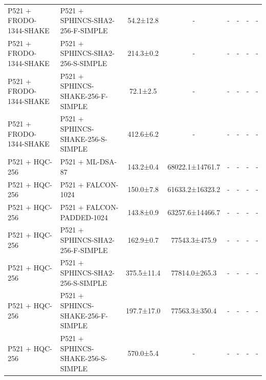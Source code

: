 \documentclass[10pt]{article}
\begin{document}
\begin{tabular}{@{}l l c c c c c c@{}}
P521 + FRODO-1344-SHAKE & P521 + SPHINCS-SHA2-256-F-SIMPLE & 54.2±12.8 & - & - & - & - & - \\
P521 + FRODO-1344-SHAKE & P521 + SPHINCS-SHA2-256-S-SIMPLE & 214.3±0.2 & - & - & - & - & - \\
P521 + FRODO-1344-SHAKE & P521 + SPHINCS-SHAKE-256-F-SIMPLE & 72.1±2.5 & - & - & - & - & - \\
P521 + FRODO-1344-SHAKE & P521 + SPHINCS-SHAKE-256-S-SIMPLE & 412.6±6.2 & - & - & - & - & - \\
P521 + HQC-256 & P521 + ML-DSA-87 & 143.2±0.4 & 68022.1±14761.7 & - & - & - & - \\
P521 + HQC-256 & P521 + FALCON-1024 & 150.0±7.8 & 61633.2±16323.2 & - & - & - & - \\
P521 + HQC-256 & P521 + FALCON-PADDED-1024 & 143.8±0.9 & 63257.6±14466.7 & - & - & - & - \\
P521 + HQC-256 & P521 + SPHINCS-SHA2-256-F-SIMPLE & 162.9±0.7 & 77543.3±475.9 & - & - & - & - \\
P521 + HQC-256 & P521 + SPHINCS-SHA2-256-S-SIMPLE & 375.5±11.4 & 77814.0±265.3 & - & - & - & - \\
P521 + HQC-256 & P521 + SPHINCS-SHAKE-256-F-SIMPLE & 197.7±17.0 & 77563.3±350.4 & - & - & - & - \\
P521 + HQC-256 & P521 + SPHINCS-SHAKE-256-S-SIMPLE & 570.0±5.4 & - & - & - & - & - \\
\bottomrule
\end{tabular}
\end{document}
